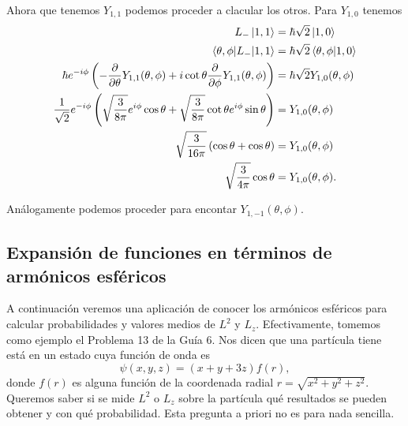 \documentclass[10pt, a4paper]{article}
\newcommand{\Ylmev}[2]{Y_{#1,#2}}
\numberwithin{equation}{subsection}
\begin{document}
Ahora que tenemos $\Ylmev{1}{1}$ podemos proceder a clacular los otros. Para
$\Ylmev{1}{0}$ tenemos
\begin{align}
  L_-\ket{1,1} &= \hbar\sqrt{2}\ket{1,0} \\
  \matrixel{\theta,\phi}{L_-}{1,1} &=
    \hbar\sqrt{2}\braket{\theta,\phi}{1,0} \\
  \hbar e^{-i\phi}\left(-\pdv{\theta}\Ylmev{1}{1}(\theta,\phi) +
    i\cot\theta\pdv{\phi}\Ylmev{1}{1}(\theta,\phi)\right) &=
    \hbar\sqrt{2}\Ylmev{1}{0}(\theta,\phi) \\
  \frac{1}{\sqrt{2}}e^{-i\phi}\left(
    \sqrt{\frac{3}{8\pi}}e^{i\phi}\cos\theta +
    \sqrt{\frac{3}{8\pi}}\cot\theta e^{i\phi}\sin\theta\right) &=
    \Ylmev{1}{0}(\theta,\phi) \\
  \sqrt{\frac{3}{16\pi}}\left( \cos\theta + \cos\theta\right) &=
    \Ylmev{1}{0}(\theta,\phi) \\
  \sqrt{\frac{3}{4\pi}}\cos\theta &= \Ylmev{1}{0}(\theta,\phi).
\end{align}

Análogamente podemos proceder para encontar $\Ylmev{1}{-1}(\theta,\phi)$.

\subsection{Expansión de funciones en términos de armónicos esféricos}

A continuación veremos una aplicación de conocer los armónicos esféricos para
calcular probabilidades y valores medios de $L^2$ y $L_z$. Efectivamente,
tomemos como ejemplo el Problema 13 de la Guía 6. Nos dicen que una partícula
tiene está en un estado cuya función de onda es
\begin{equation}
  \psi(x,y,z) = (x + y + 3z)f(r),
\end{equation}
donde $f(r)$ es alguna función de la coordenada radial $r = \sqrt{x^2 + y^2 +
z^2}$. Queremos saber si se mide $L^2$ o $L_z$ sobre la partícula qué
resultados se pueden obtener y con qué probabilidad. Esta pregunta a priori no
es para nada sencilla.

\end{document}
